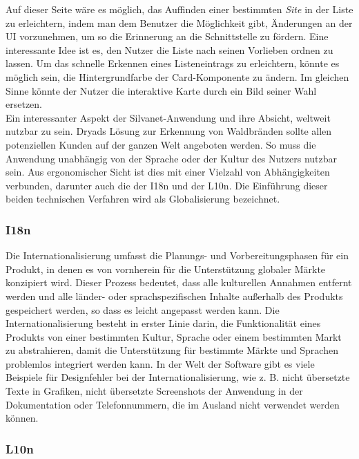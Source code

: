 Auf dieser Seite wäre es möglich, das Auffinden einer bestimmten \textit{Site} in der Liste zu erleichtern, indem man dem Benutzer die Möglichkeit gibt, Änderungen an der \ac{UI} vorzunehmen, um so die Erinnerung an die Schnittstelle zu fördern.
Eine interessante Idee ist es, den Nutzer die Liste nach seinen Vorlieben ordnen zu lassen.
Um das schnelle Erkennen eines Listeneintrags zu erleichtern, könnte es möglich sein, die Hintergrundfarbe der Card-Komponente zu ändern.
Im gleichen Sinne könnte der Nutzer die interaktive Karte durch ein Bild seiner Wahl ersetzen.\\

Ein interessanter Aspekt der Silvanet-Anwendung und ihre Absicht, weltweit nutzbar zu sein.
Dryads Lösung zur Erkennung von Waldbränden sollte allen potenziellen Kunden auf der ganzen Welt angeboten werden.
So muss die Anwendung unabhängig von der Sprache oder der Kultur des Nutzers nutzbar sein.
Aus ergonomischer Sicht ist dies mit einer Vielzahl von Abhängigkeiten verbunden, darunter auch die der \ac{I18n} und der \ac{L10n}.
Die Einführung dieser beiden technischen Verfahren wird als Globalisierung bezeichnet\cite{lisa}.


\subsubsection{\ac{I18n}}

Die Internationalisierung umfasst die Planungs- und Vorbereitungsphasen für ein Produkt, in denen es von vornherein für die Unterstützung globaler Märkte konzipiert wird.
Dieser Prozess bedeutet, dass alle kulturellen Annahmen entfernt werden und alle länder- oder sprachspezifischen Inhalte außerhalb des Produkts gespeichert werden, so dass es leicht angepasst werden kann.
Die Internationalisierung besteht in erster Linie darin, die Funktionalität eines Produkts von einer bestimmten Kultur, Sprache oder einem bestimmten Markt zu abstrahieren, damit die Unterstützung für bestimmte Märkte und Sprachen problemlos integriert werden kann.
In der Welt der Software gibt es viele Beispiele für Designfehler bei der Internationalisierung, wie z. B. nicht übersetzte Texte in Grafiken, nicht übersetzte Screenshots der Anwendung in der Dokumentation oder Telefonnummern, die im Ausland nicht verwendet werden können.

\subsubsection{\ac{L10n}}

